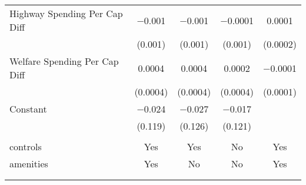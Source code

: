 \begin{table}[!htbp]
\begin{tabular}{@{\extracolsep{5pt}}lcccc}
  Highway Spending Per Cap Diff & $-$0.001 & $-$0.001 & $-$0.0001 & 0.0001 \\ 
  & (0.001) & (0.001) & (0.001) & (0.0002) \\ 
  Welfare Spending Per Cap Diff & 0.0004 & 0.0004 & 0.0002 & $-$0.0001 \\ 
  & (0.0004) & (0.0004) & (0.0004) & (0.0001) \\ 
  Constant & $-$0.024 & $-$0.027 & $-$0.017 &  \\ 
  & (0.119) & (0.126) & (0.121) &  \\ 
 \hline \\[-1.8ex] 
controls & Yes & Yes & No & Yes \\ 
amenities & Yes & No & No & Yes \\ 
\hline \\[-1.8ex] 
\hline 
\hline \\[-1.8ex] 
\end{tabular} 
\end{table} 
